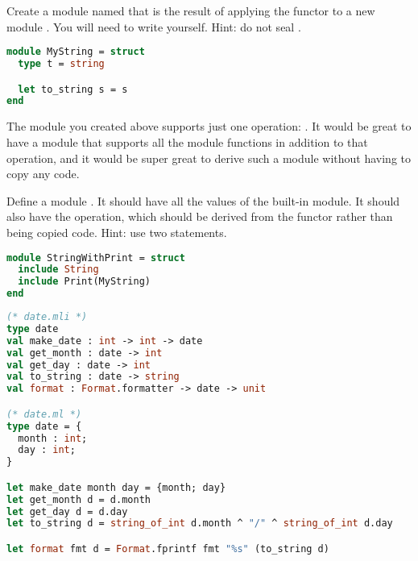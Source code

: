 Create a module named  that is the result of applying the functor  to a new module . You will need to write  yourself. Hint: do not seal .

\begin{lstlisting}[language=OCaml]
module MyString = struct
  type t = string

  let to_string s = s
end
\end{lstlisting}

The  module you created above supports just one operation: . It would be great to have a module that supports all the  module functions in addition to that  operation, and it would be super great to derive such a module without having to copy any code.

Define a module . It should have all the values of the built-in  module. It should also have the  operation, which should be derived from the  functor rather than being copied code. Hint: use two  statements.

\begin{lstlisting}[language=OCaml]
module StringWithPrint = struct
  include String
  include Print(MyString)
end
\end{lstlisting}

\problem[date]
\begin{lstlisting}[language=OCaml]
(* date.mli *)
type date
val make_date : int -> int -> date
val get_month : date -> int
val get_day : date -> int
val to_string : date -> string
val format : Format.formatter -> date -> unit

(* date.ml *)
type date = {
  month : int;
  day : int;
}

let make_date month day = {month; day}
let get_month d = d.month
let get_day d = d.day
let to_string d = string_of_int d.month ^ "/" ^ string_of_int d.day

let format fmt d = Format.fprintf fmt "%s" (to_string d)
\end{lstlisting}

